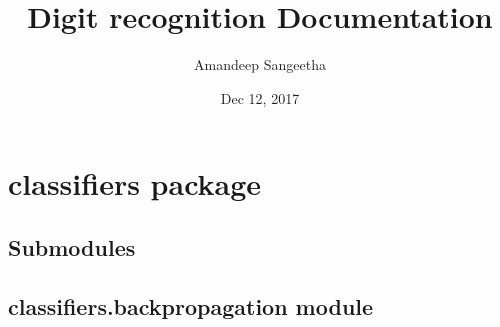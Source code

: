 \documentclass[letterpaper,10pt,english]{sphinxmanual}
\title{Digit recognition Documentation}
\date{Dec 12, 2017}
\author{Amandeep Sangeetha}
\begin{document}
\maketitle
\sphinxtableofcontents
{}\label{\detokenize{index::doc}}



\chapter{classifiers package}
\label{\detokenize{classifiers:welcome-to-digit-recognition-s-documentation}}\label{\detokenize{classifiers:classifiers-package}}\label{\detokenize{classifiers::doc}}

\section{Submodules}
\label{\detokenize{classifiers:submodules}}

\section{classifiers.backpropagation module}
\label{\detokenize{classifiers:module-classifiers.backpropagation}}\label{\detokenize{classifiers:classifiers-backpropagation-module}}
\end{document}
